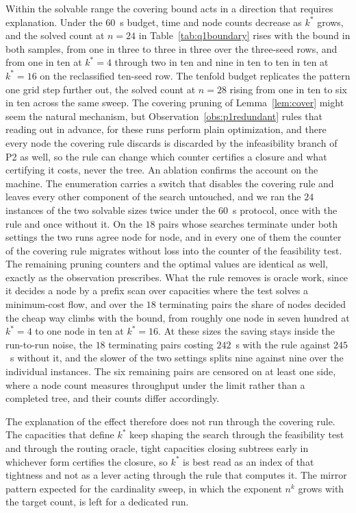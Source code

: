 Within the solvable range the covering bound acts in a direction that
requires explanation. Under the $60$~s budget, time and node counts decrease as $k^\ast$
grows, and the solved count at $n=24$ in Table~\ref{tab:q1boundary}
rises with the bound in both samples, from one in three to three in
three over the three-seed rows, and from one in ten at $k^\ast=4$
through two in ten and nine in ten to ten in ten at $k^\ast=16$ on the
reclassified ten-seed row. The
tenfold budget replicates the pattern one grid step further out, the
solved count at $n=28$ rising from one in ten to six in ten across the
same sweep. The
covering pruning of Lemma~\ref{lem:cover} might seem the natural
mechanism, but Observation~\ref{obs:p1redundant} rules that reading out
in advance, for these runs perform plain optimization, and there every
node the covering rule discards is discarded by the infeasibility
branch of P2 as well, so the rule can change which counter certifies a
closure and what certifying it costs, never the tree. An ablation
confirms the account on the machine. The enumeration carries a switch
that disables the covering rule and leaves every other component of the
search untouched, and we ran the $24$ instances of the two solvable
sizes twice under the $60$~s protocol, once with the rule and once
without it. On the $18$
pairs whose searches terminate under both settings the two runs agree
node for node, and in every one of them the counter of the covering rule
migrates without loss into the counter of the feasibility test. The
remaining pruning counters and the optimal values are identical as well,
exactly as the observation prescribes. What the rule removes is oracle
work, since it
decides a node by a prefix scan over capacities where the test solves a
minimum-cost flow, and over the $18$ terminating pairs the share of
nodes decided the cheap way climbs
with the bound, from roughly one node in seven hundred at $k^\ast=4$
to one node in ten at $k^\ast=16$. At these sizes the saving stays inside the
run-to-run noise, the $18$ terminating pairs costing $242$~s with the
rule against $245$~s without it, and the slower of the two settings
splits nine against nine over the individual instances. The six
remaining pairs are censored on at least one side, where a node count
measures throughput under the limit rather than a completed tree, and
their counts differ accordingly.

The explanation of the effect therefore does not run through the
covering rule. The capacities that define $k^\ast$ keep shaping the
search through the feasibility test and through the routing oracle,
tight capacities closing subtrees early in whichever form certifies
the closure, so $k^\ast$ is best read as an index of that tightness
and not as a lever acting through the rule that computes it. The
mirror pattern expected for the
cardinality sweep, in which the exponent $n^k$ grows with the target count, is
left for a dedicated run.

